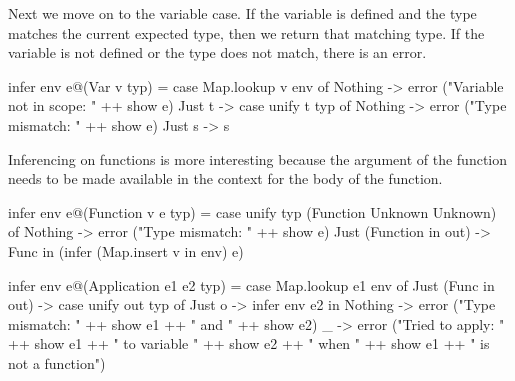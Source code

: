 \documentclass[12pt]{article}
\begin{document}
Next we move on to the variable case.
If the variable is defined and the type matches the current expected type,
then we return that matching type.
If the variable is not defined or the type does not match, there is an
error.
\begin{code}
infer env e@(Var v typ) =
  case Map.lookup v env of
    Nothing -> error ("Variable not in scope: " ++ show e)
    Just t ->
      case unify t typ of
        Nothing -> error ("Type mismatch: " ++ show e)
        Just s -> s
\end{code}

Inferencing on functions is more interesting because the argument of the
function needs to be made available in the context for the body of the
function.

\begin{code}
infer env e@(Function v e typ) =
  case unify typ (Function Unknown Unknown) of
    Nothing -> error ("Type mismatch: " ++ show e)
    Just (Function in out) -> Func in (infer (Map.insert v in env) e)
\end{code}


\begin{code}
infer env e@(Application e1 e2 typ) =
  case Map.lookup e1 env of
    Just (Func in out) ->
      case unify out typ of
        Just o -> infer env e2 in
        Nothing -> error ("Type mismatch: " ++ show e1 ++ " and " ++ show e2)
    _ -> error ("Tried to apply: " ++ show e1 ++ " to variable " ++ show e2 ++ " when " ++ show e1 ++ " is not a function")
\end{code}










\end{document}
